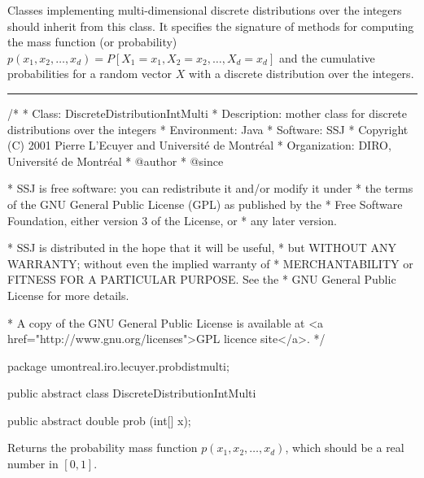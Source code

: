 
Classes implementing multi-dimensional discrete distributions over the integers
should inherit from this class.
It specifies the signature of methods for computing the mass function
(or probability) $p(x_1, x_2, \ldots, x_d) = 
 P[X_1 = x_1, X_2 = x_2, \ldots, X_d = x_d]$ and the cumulative probabilities 
for a random vector $X$ with a discrete distribution over the integers.

\bigskip\hrule

\begin{code}
\begin{hide}
/*
 * Class:        DiscreteDistributionIntMulti
 * Description:  mother class for discrete distributions over the integers
 * Environment:  Java
 * Software:     SSJ 
 * Copyright (C) 2001  Pierre L'Ecuyer and Université de Montréal
 * Organization: DIRO, Université de Montréal
 * @author       
 * @since

 * SSJ is free software: you can redistribute it and/or modify it under
 * the terms of the GNU General Public License (GPL) as published by the
 * Free Software Foundation, either version 3 of the License, or
 * any later version.

 * SSJ is distributed in the hope that it will be useful,
 * but WITHOUT ANY WARRANTY; without even the implied warranty of
 * MERCHANTABILITY or FITNESS FOR A PARTICULAR PURPOSE.  See the
 * GNU General Public License for more details.

 * A copy of the GNU General Public License is available at
   <a href="http://www.gnu.org/licenses">GPL licence site</a>.
 */
\end{hide}
package umontreal.iro.lecuyer.probdistmulti;


public abstract class DiscreteDistributionIntMulti\begin{hide} {
   protected int dimension;
  \end{hide}

   public abstract double prob (int[] x);
\end{code}
\begin{tabb}  Returns the probability mass function $p(x_1, x_2, \ldots, x_d)$,
   which should be a real number in $[0,1]$.
\end{tabb}
\begin{htmlonly}
\end{htmlonly}
